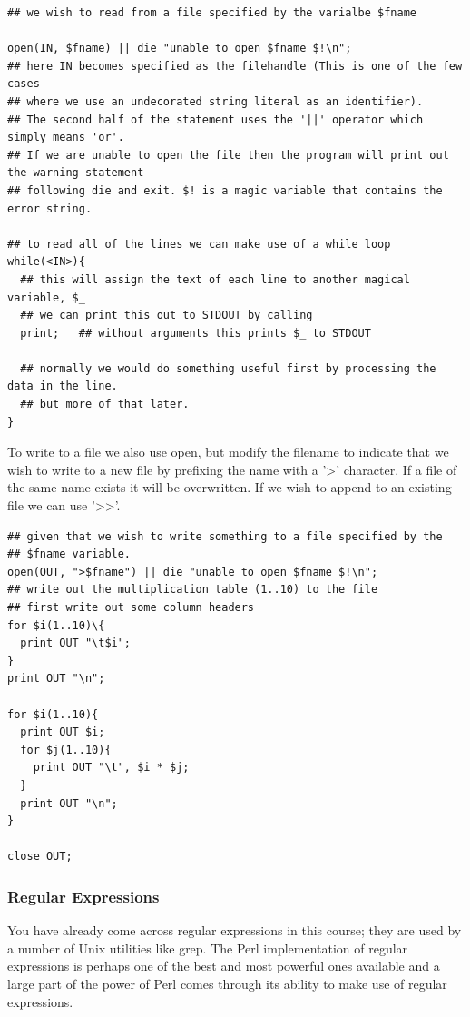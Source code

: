 \documentclass[11pt]{article}
\begin{document}
\begin{verbatim}
## we wish to read from a file specified by the varialbe $fname

open(IN, $fname) || die "unable to open $fname $!\n";
## here IN becomes specified as the filehandle (This is one of the few cases
## where we use an undecorated string literal as an identifier).
## The second half of the statement uses the '||' operator which simply means 'or'.
## If we are unable to open the file then the program will print out the warning statement
## following die and exit. $! is a magic variable that contains the error string.

## to read all of the lines we can make use of a while loop
while(<IN>){
  ## this will assign the text of each line to another magical variable, $_
  ## we can print this out to STDOUT by calling
  print;   ## without arguments this prints $_ to STDOUT

  ## normally we would do something useful first by processing the data in the line.
  ## but more of that later.
}
\end{verbatim}



To write to a file we also use open, but modify the filename to indicate
that we wish to write to a new file by prefixing the name with a '>'
character. If a file of the same name exists it will be overwritten. If
we wish to append to an existing file we can use '>>'.

\begin{verbatim}
## given that we wish to write something to a file specified by the
## $fname variable.
open(OUT, ">$fname") || die "unable to open $fname $!\n";
## write out the multiplication table (1..10) to the file
## first write out some column headers
for $i(1..10)\{
  print OUT "\t$i";
}
print OUT "\n";

for $i(1..10){
  print OUT $i;
  for $j(1..10){
    print OUT "\t", $i * $j;
  }
  print OUT "\n";
}

close OUT;
\end{verbatim}

\subsubsection{Regular Expressions}
\label{sec-5-0-6}

You have already come across regular expressions in this course; they
are used by a number of Unix utilities like grep. The Perl
implementation of regular expressions is perhaps one of the best and
most powerful ones available and a large part of the power of Perl comes
through its ability to make use of regular expressions.
\end{document}
